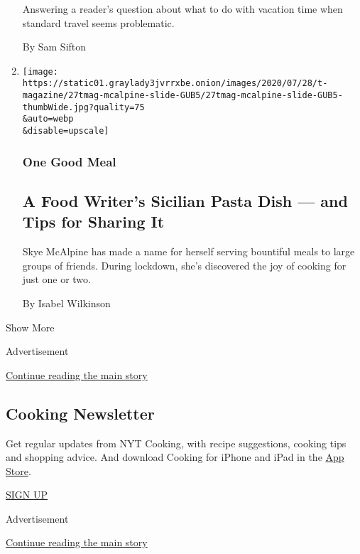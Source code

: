 \begin{enumerate}
  Answering a reader's question about what to do with vacation time when
  standard travel seems problematic.

  By Sam Sifton
\item
  \href{/2020/07/29/t-magazine/skye-mcalpine-pasta-cooking.html}{}

  \texttt{[image: https://static01.graylady3jvrrxbe.onion/images/2020/07/28/t-magazine/27tmag-mcalpine-slide-GUB5/27tmag-mcalpine-slide-GUB5-thumbWide.jpg?quality=75\\\&auto=webp\\\&disable=upscale]}

  \hypertarget{one-good-meal}{%
  \subsubsection{One Good Meal}\label{one-good-meal}}

  \hypertarget{a-food-writers-sicilian-pasta-dish--and-tips-for-sharing-it}{%
  \subsection{A Food Writer's Sicilian Pasta Dish --- and Tips for
  Sharing
  It}\label{a-food-writers-sicilian-pasta-dish--and-tips-for-sharing-it}}

  Skye McAlpine has made a name for herself serving bountiful meals to
  large groups of friends. During lockdown, she's discovered the joy of
  cooking for just one or two.

  By Isabel Wilkinson
\end{enumerate}

Show More

Advertisement

\protect\hyperlink{after-mid2}{Continue reading the main story}

\hypertarget{cooking-newsletter}{%
\subsection{Cooking Newsletter}\label{cooking-newsletter}}

Get regular updates from NYT Cooking, with recipe suggestions, cooking
tips and shopping advice. And download Cooking for iPhone and iPad in
the
\href{https://itunes.apple.com/us/app/nyt-cooking-recipes-from-new/id911422904?mt=8}{App
Store}.

\href{/newsletters/signup/CK}{SIGN UP}

Advertisement

\protect\hyperlink{after-mktg}{Continue reading the main story}

